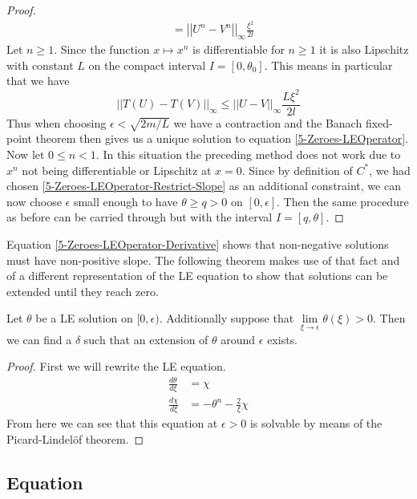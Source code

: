 \begin{proof}
\begin{align}
								&=		\left|\left|U^n-V^n\right|\right|_\infty\frac{\xi^2}{2l}
	\end{align}
	Let $n\geq1$. 
	Since the function $x\mapsto x^n$ is differentiable for $n\geq1$ it is also Lipschitz with constant $L$ on the compact interval $I=[0,\theta_0]$.
	This means in particular that we have
	\begin{equation}
		||T(U)-T(V)||_\infty	\leq	\left|\left|U-V\right|\right|_\infty\frac{L\xi^2}{2l}
	\end{equation}
	Thus when choosing $\epsilon<\sqrt{2m/L}$ we have a contraction and the Banach fixed-point theorem then gives us a unique solution to equation \ref{5-Zeroes-LEOperator}.\\
	Now let $0\leq n<1$.
	In this situation the preceding method does not work due to $x^n$ not being differentiable or Lipschitz at $x=0$. 
	Since by definition of $C^*$, we had chosen \eqref{5-Zeroes-LEOperator-Restrict-Slope} as an additional constraint, we can now choose $\epsilon$ small enough to have $\theta\geq q>0$ on $[0,\epsilon]$.
	Then the same procedure as before can be carried through but with the interval $I=[q,\theta]$.
\end{proof}
Equation \eqref{5-Zeroes-LEOperator-Derivative} shows that non-negative solutions must have non-positive slope.
The following theorem makes use of that fact and of a different representation of the \ac{LE} equation to show that solutions can be extended until they reach zero.
\begin{lemma}
	Let $\theta$ be a \ac{LE} solution on $[0,\epsilon)$. 
	Additionally suppose that $\lim\limits_{\xi\rightarrow\epsilon}\theta(\xi)>0$.
	Then we can find a $\delta$ such that an extension of $\theta$ around $\epsilon$ exists.
\end{lemma}
\begin{proof}
	First we will rewrite the \ac{LE} equation.
	\begin{align}
		\frac{d\theta}{d\xi} &= \chi\\
		\frac{d\chi}{d\xi} &= -\theta^n - \frac{2}{\xi}\chi
	\end{align}
	From here we can see that this equation at $\epsilon>0$ is solvable by means of the Picard-Lindelöf theorem.
	
\end{proof}
%
%
%
\subsection{ Equation}

%
%
%
